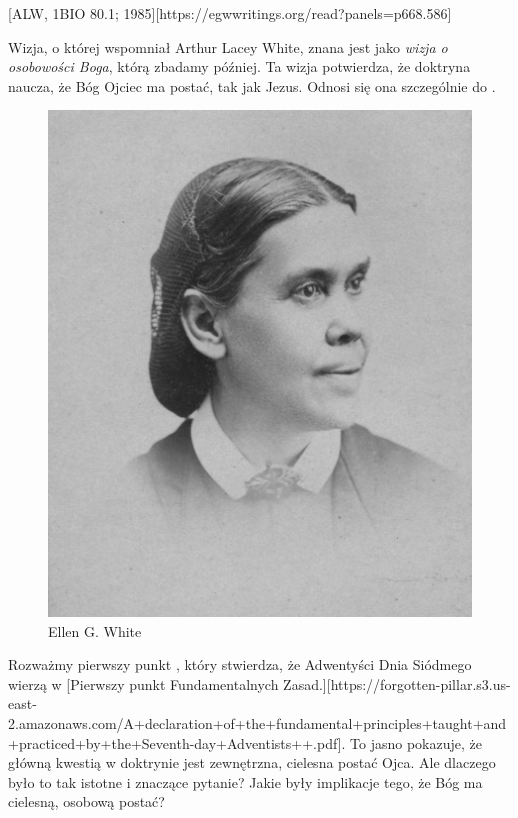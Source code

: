 [ALW, 1BIO 80.1; 1985][https://egwwritings.org/read?panels=p668.586]

Wizja, o której wspomniał Arthur Lacey White, znana jest jako \textit{wizja o osobowości Boga}, którą zbadamy później. Ta wizja potwierdza, że doktryna  naucza, że Bóg Ojciec ma postać, tak jak Jezus. Odnosi się ona szczególnie do .

\begin{figure}[t]
    \centering
    \includegraphics[width=0.65\linewidth]{images/ellen-white.jpg}
    \caption*{Ellen G. White}
    \label{fig:ellen-g-white}
\end{figure}

Rozważmy pierwszy punkt , który stwierdza, że Adwentyści Dnia Siódmego wierzą w [Pierwszy punkt Fundamentalnych Zasad.][https://forgotten-pillar.s3.us-east-2.amazonaws.com/A+declaration+of+the+fundamental+principles+taught+and+practiced+by+the+Seventh-day+Adventists++.pdf]. To jasno pokazuje, że główną kwestią w doktrynie  jest zewnętrzna, cielesna postać Ojca. Ale dlaczego było to tak istotne i znaczące pytanie? Jakie były implikacje tego, że Bóg ma cielesną, osobową postać?

